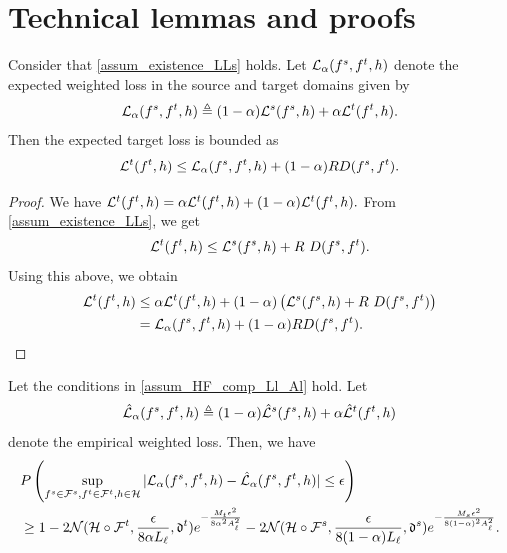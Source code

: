 \documentclass[review,supplement,onefignum,onetabnum]{siamonline250211}
\begin{document}
\maketitle

\section{Technical lemmas and proofs}

\begin{lemma}
\label{lem:dev_exptar_expweigh}
Consider that \cref{assum_existence_LLs} holds. Let $\mathcal{L}_{\alpha}(f^s, f^t, h)$ denote the expected weighted loss in the source and target domains given by
%
\[
\mathcal{L}_{\alpha}(f^s, f^t, h) \triangleq  (1-\alpha) \mathcal{L}^s(f^s, h) + \alpha \mathcal{L}^t(f^t, h).
\]
%
Then the expected target loss is bounded as
%
\[\mathcal{L}^t(f^t, h) \leq   \mathcal{L}_{\alpha}(f^s, f^t, h)+ (1-\alpha) R  D(f^s, f^t).\]
\end{lemma}
    
\begin{proof}
We have
$ 
\mathcal{L}^t(f^t, h) = \alpha \mathcal{L}^t(f^t, h) +  (1-\alpha) \mathcal{L}^t(f^t, h).
$
From \cref{assum_existence_LLs}, we get
%
\[
    \Lt(\ft, \h) \leq \Ls (\fs, \h) + \LLs \ \D(\fs, \ft).
\]
%
Using this above, we obtain
%
\begin{equation*}
\begin{split}
\mathcal{L}^t(f^t, h) &\leq \alpha \mathcal{L}^t(f^t, h) 
+  (1-\alpha) \left( \mathcal{L}^s (f^s, h) + R \ D(f^s, f^t) \right)\\
&= \mathcal{L}_{\alpha}(f^s, f^t, h)+ (1-\alpha) R  D(f^s, f^t).
\end{split}
\end{equation*}
%
\end{proof}



\begin{lemma}
    \label{lem:weight_loss_gen}
    Let the conditions in \cref{assum_HF_comp_Ll_Al} hold. Let
    \[
    \hat{\mathcal{L}}_{\alpha}(f^s, f^t, h) \triangleq  (1-\alpha) \hat{\mathcal{L}}^s(f^s, h) + \alpha \hat{\mathcal{L}}^t(f^t, h)
    \]
    denote the empirical weighted loss. Then, we have
    \begin{equation*}
    \begin{split}
    &P\left (\sup_{f^s \in \mathcal{F}^s, f^t \in \mathcal{F}^t, h \in \mathcal{H}} |  \mathcal{L}_{\alpha}( f^s, f^t, h ) - \hat{\mathcal{L}}_{\alpha}( f^s,  f^t, h )   |  \leq \epsilon \right) \\
    & \geq 1 - 2 \mathcal{N}( \mathcal{H} \circ \mathcal{F}^t, \frac{\epsilon}{8 \alpha L_\ell}, \mathfrak{d}^t) e^{-\frac{M_t \epsilon^2}{8 \alpha^2 A_\ell^2}} 
    -2 \mathcal{N}( \mathcal{H} \circ \mathcal{F}^s, \frac{\epsilon}{8 (1-\alpha) L_\ell}, \mathfrak{d}^s) e^{-\frac{M_s \epsilon^2}{8 (1-\alpha)^2 A_\ell^2}}.
    \end{split}
    \end{equation*}
\end{lemma}
\end{document}
